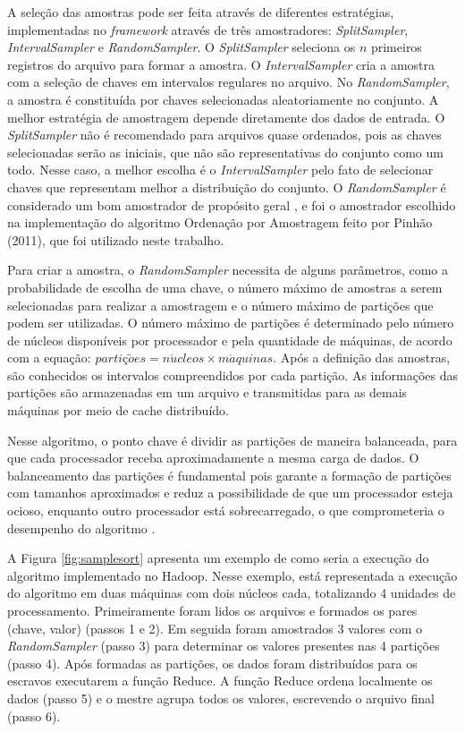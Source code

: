 A seleção das amostras pode ser feita através de diferentes estratégias, implementadas no \textit{framework} através de três amostradores: \textit{SplitSampler}, \textit{IntervalSampler} e \textit{RandomSampler}. O \textit{SplitSampler} seleciona os $n$ primeiros registros do arquivo para formar a amostra. O \textit{IntervalSampler} cria a amostra com a seleção de chaves em intervalos regulares no arquivo. No \textit{RandomSampler}, a amostra é constituída por chaves selecionadas aleatoriamente no conjunto. 
A melhor estratégia de amostragem depende diretamente dos dados de entrada. O \textit{SplitSampler} não é recomendado para arquivos quase ordenados, pois as chaves selecionadas serão as iniciais, que não são representativas do conjunto como um todo. Nesse caso, a melhor escolha é o \textit{IntervalSampler} pelo fato de selecionar chaves que representam melhor a distribuição do conjunto. O \textit{RandomSampler} é considerado um bom amostrador de propósito geral \cite{White:2009}, e foi o amostrador escolhido na implementação do algoritmo Ordenação por Amostragem feito por Pinhão (2011), que foi utilizado neste trabalho.

Para criar a amostra, o \textit{RandomSampler} necessita de alguns parâmetros, como a probabilidade de escolha de uma chave, o número máximo de amostras a serem selecionadas para realizar a amostragem e o número máximo de partições que podem ser utilizadas.
O número máximo de partições é determinado pelo número de núcleos disponíveis por processador e pela quantidade de máquinas, de acordo com a equação: \mbox{$ parti \text{\c{c}} \tilde{o}es = n\acute{u}cleos \times m\acute{a}quinas$}.
Após a definição das amostras, são conhecidos os intervalos compreendidos por cada partição. As informações das partições são armazenadas em um arquivo e transmitidas para as demais máquinas por meio de cache distribuído.

Nesse algoritmo, o ponto chave é dividir as partições de maneira balanceada, para que cada processador receba aproximadamente a mesma carga de dados. O balanceamento das partições é fundamental pois garante a formação de partições com tamanhos aproximados e reduz a possibilidade de que um processador esteja ocioso, enquanto outro processador está sobrecarregado, o que comprometeria o desempenho do algoritmo \cite{White:2009}.


A Figura \ref{fig:samplesort} apresenta um exemplo de como seria a execução do algoritmo implementado no Hadoop. 
Nesse exemplo, está representada a execução do algoritmo em duas máquinas com dois núcleos cada, totalizando 4 unidades de processamento. 
Primeiramente foram lidos os arquivos e formados os pares (chave, valor) (passos 1 e 2). 
 Em seguida foram amostrados 3 valores com o \textit{RandomSampler}  (passo 3) para determinar os valores presentes nas 4 partições  (passo 4). Após formadas as partições, os dados foram distribuídos para os escravos executarem a função Reduce.  
A função Reduce ordena localmente os dados  (passo 5) e o mestre agrupa todos os valores, escrevendo o arquivo final (passo 6).

